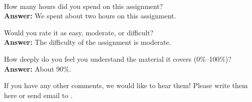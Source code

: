\documentclass[11pt]{article}
\begin{document}
\begin{debriefing} \hfill\\[-4ex]
\begin{enumerate*}
\item How many hours did you spend on this assignment?\\
\noindent \textbf{Answer:} We spent about two hours on this assignment.\\
\item Would you rate it as easy, moderate, or difficult?\\
\noindent \textbf{Answer:} The difficulty of the assignment is moderate.\\ 
\item How deeply do you feel you understand the material it covers (0\%–100\%)?\\
\noindent \textbf{Answer:} About 90\%.\\
\item If you have any other comments, we would like to hear them!
  Please write them here or send email to
  .
\end{enumerate*}
\end{debriefing}
\end{document}
